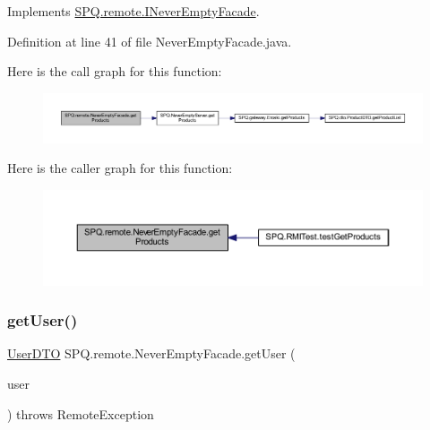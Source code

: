 Implements \mbox{\hyperlink{interface_s_p_q_1_1remote_1_1_i_never_empty_facade_a62d4a1747b8ba90f451fc9f9343055f3}{S\+P\+Q.\+remote.\+I\+Never\+Empty\+Facade}}.



Definition at line 41 of file Never\+Empty\+Facade.\+java.

Here is the call graph for this function\+:
\nopagebreak
\begin{figure}[H]
\begin{center}
\leavevmode
\includegraphics[width=350pt]{class_s_p_q_1_1remote_1_1_never_empty_facade_a4c8bdeeb3d2c3eb2c28aec1043e9274f_cgraph}
\end{center}
\end{figure}
Here is the caller graph for this function\+:
\nopagebreak
\begin{figure}[H]
\begin{center}
\leavevmode
\includegraphics[width=350pt]{class_s_p_q_1_1remote_1_1_never_empty_facade_a4c8bdeeb3d2c3eb2c28aec1043e9274f_icgraph}
\end{center}
\end{figure}
\mbox{\label{class_s_p_q_1_1remote_1_1_never_empty_facade_a32679a25e12c8a33e84087de357cd616}} 
\subsubsection{\texorpdfstring{get\+User()}{getUser()}}
{\footnotesize\ttfamily \mbox{\hyperlink{class_s_p_q_1_1dto_1_1_user_d_t_o}{User\+D\+TO}} S\+P\+Q.\+remote.\+Never\+Empty\+Facade.\+get\+User (\begin{DoxyParamCaption}\item[{\mbox{\hyperlink{class_s_p_q_1_1dto_1_1_user_d_t_o}{User\+D\+TO}}}]{user }\end{DoxyParamCaption}) throws Remote\+Exception}



